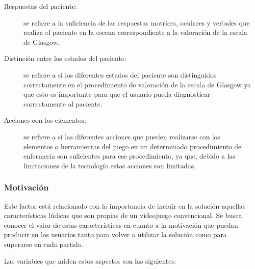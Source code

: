 \begin{description}

\item [Respuestas del paciente:] se refiere a la suficiencia de las respuestas 
    motrices, oculares y verbales que realiza el paciente en la escena 
    correspondiente a la valoración de la escala de Glasgow.

\item[Distinción entre los estados del paciente:] se refiere a si los diferentes
    estados del paciente son distinguidos correctamente en el procedimiento de
    valoración de la escala de Glasgow ya que esto es importante para que el
    usuario pueda diagnosticar correctamente al paciente.

\item[Acciones con los elementos:] se refiere a si las diferentes acciones que
    pueden realizarse con los elementos o herramientas del juego en un
    determinado procedimiento de enfermería son suficientes para ese
    procedimiento, ya que, debido a las limitaciones de la tecnología estas
    acciones son limitadas.

\end{description}

\subsubsection{Motivación}
\label{sec:sub_motivacion}

Este factor está relacionado con la importancia de incluir en la solución
aquellas características lúdicas que son propias de un videojuego convencional. Se
busca conocer el valor de estas características en cuanto a la motivación que
puedan producir en los usuarios tanto para volver a utilizar la solución como
para superarse en cada partida.

Las variables que miden estos aspectos son las siguientes:

